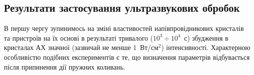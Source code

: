 
\subsection{Результати застосування ультразвукових обробок}

В першу чергу зупинимось на зміні властивостей напівпровідникових кристалів та пристроїв на їх основі в результаті тривалого ($10^3\div10^4$~с) збудження в кристалах АХ значної (зазвичай не менше 1~Вт/см$^2$) інтенсивності.
Характерною особливістю подібних експериментів є те, що визначення параметрів відбувається після припинення дії пружних коливань.

